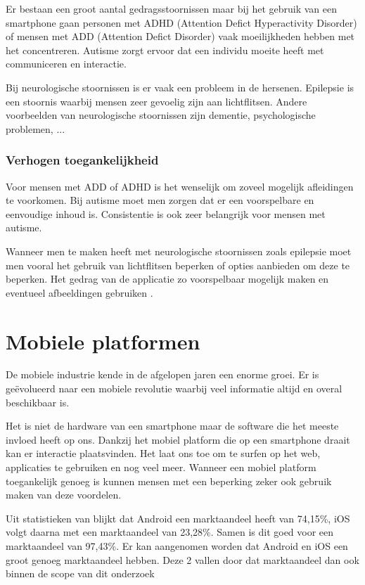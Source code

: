 Er bestaan een groot aantal gedragsstoornissen maar bij het gebruik van een smartphone gaan personen met ADHD (Attention Defict Hyperactivity Disorder) of mensen met ADD (Attention Defict Disorder) vaak moeilijkheden hebben met het concentreren. Autisme
zorgt ervoor dat een individu moeite heeft met communiceren en interactie.


Bij neurologische stoornissen is er vaak een probleem in de hersenen. Epilepsie is een stoornis waarbij mensen zeer gevoelig zijn aan lichtflitsen. Andere voorbeelden van neurologische stoornissen zijn dementie, psychologische problemen, ... 
\autocite{patel2016mental}

\subsubsection{Verhogen toegankelijkheid}
Voor mensen met ADD of ADHD is het wenselijk om zoveel mogelijk afleidingen te voorkomen. Bij autisme moet men zorgen dat er een voorspelbare en eenvoudige inhoud is. Consistentie is ook zeer belangrijk voor mensen met autisme.

Wanneer men te maken heeft met neurologische stoornissen zoals epilepsie moet men vooral het gebruik van lichtflitsen beperken of opties aanbieden om deze te beperken. Het gedrag van de applicatie zo voorspelbaar mogelijk maken en eventueel afbeeldingen gebruiken 
 \autocite{accessibility2019}.



\section{Mobiele platformen}
\label{sec:mobielePlatformen}
De mobiele industrie kende in de afgelopen jaren een enorme groei. Er is geëvolueerd naar een mobiele revolutie waarbij veel informatie altijd en overal beschikbaar is. 

Het is niet de hardware van een smartphone maar de software die het meeste invloed heeft op ons. Dankzij het mobiel platform die op een smartphone draait kan er interactie plaatsvinden. Het laat ons toe om te surfen op het web, applicaties te gebruiken en nog veel meer. Wanneer een mobiel platform toegankelijk genoeg is kunnen mensen met een beperking zeker ook gebruik maken van deze voordelen. 


Uit statistieken van \textcite{statMobile2019} blijkt dat Android een marktaandeel heeft van 74,15\%, iOS volgt daarna met een marktaandeel van 23,28\%. Samen is dit goed voor een marktaandeel van 97,43\%. Er kan aangenomen worden dat Android en iOS een groot genoeg marktaandeel hebben. Deze 2 vallen door dat marktaandeel dan ook binnen de scope van dit onderzoek

